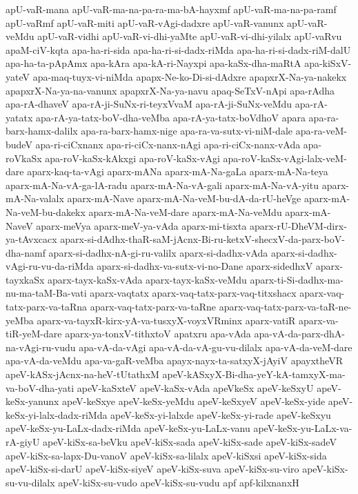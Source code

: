 {apU-vaR-mana
apU-vaR-ma-na-pa-ra-ma-bA-hayxmf
apU-vaR-ma-na-pa-ramf
apU-vaRmf
apU-vaR-miti
apU-vaR-vAgi-dadxre
apU-vaR-vanunx
apU-vaR-veMdu
apU-vaR-vidhi
apU-vaR-vi-dhi-yaMte
apU-vaR-vi-dhi-yilalx
apU-vaRvu
apaM-ciV-kqta
apa-ha-ri-sida
apa-ha-ri-si-dadx-riMda
apa-ha-ri-si-dadx-riM-dalU
apa-ha-ta-pApAmx
apa-kAra
apa-kA-ri-Nayxpi
apa-kaSx-dha-maRtA
apa-kiSxV-yateV
apa-maq-tuyx-vi-niMda
apapx-Ne-ko-Di-si-dAdxre
apapxrX-Na-ya-nakekx
apapxrX-Na-ya-na-vanunx
apapxrX-Na-ya-navu
apaq-SeTxV-nApi
apa-rAdha
apa-rA-dhaveV
apa-rA-ji-SuNx-ri-teyxVvaM
apa-rA-ji-SuNx-veMdu
apa-rA-yatatx
apa-rA-ya-tatx-boV-dha-veMba
apa-rA-ya-tatx-boVdhoV
apara
apa-ra-barx-hamx-dalilx
apa-ra-barx-hamx-nige
apa-ra-va-sutx-vi-niM-dale
apa-ra-veM-budeV
apa-ri-ciCxnanx
apa-ri-ciCx-nanx-nAgi
apa-ri-ciCx-nanx-vAda
apa-roVkaSx
apa-roV-kaSx-kAkxgi
apa-roV-kaSx-vAgi
apa-roV-kaSx-vAgi-lalx-veM-dare
aparx-kaq-ta-vAgi
aparx-mANa
aparx-mA-Na-gaLa
aparx-mA-Na-teya
aparx-mA-Na-vA-ga-lA-radu
aparx-mA-Na-vA-gali
aparx-mA-Na-vA-yitu
aparx-mA-Na-valalx
aparx-mA-Nave
aparx-mA-Na-veM-bu-dA-da-rU-heVge
aparx-mA-Na-veM-bu-dakekx
aparx-mA-Na-veM-dare
aparx-mA-Na-veMdu
aparx-mA-NaveV
aparx-meVya
aparx-meV-ya-vAda
aparx-mi-tisxta
aparx-rU-DheVM-dirx-ya-tAvxcacx
aparx-si-dAdhx-thaR-saM-jAcnx-Bi-ru-ketxV-shecxV-da-parx-boV-dha-namf
aparx-si-dadhx-nA-gi-ru-valilx
aparx-si-dadhx-vAda
aparx-si-dadhx-vAgi-ru-vu-da-riMda
aparx-si-dadhx-va-sutx-vi-no-Dane
aparx-sidedhxV
aparx-tayxkaSx
aparx-tayx-kaSx-vAda
aparx-tayx-kaSx-veMdu
aparx-ti-Si-dadhx-ma-nu-ma-taM-Ba-vati
aparx-vaqtatx
aparx-vaq-tatx-parx-vaq-titxshacx
aparx-vaq-tatx-parx-va-taRna
aparx-vaq-tatx-parx-va-taRne
aparx-vaq-tatx-parx-va-taR-ne-yeMba
aparx-va-tayxR-kirx-yA-va-tusxyX-voyxVRminx
aparx-vatiR
aparx-va-tiR-yeM-dare
aparx-ya-tonxV-tithxtoV
apatxru
apa-vAda
apa-vA-da-parx-dhA-na-vAgi-ru-vudu
apa-vA-da-vAgi
apa-vA-da-vA-gu-vu-dilalx
apa-vA-da-veM-dare
apa-vA-da-veMdu
apa-va-gaR-veMba
apayx-nayx-ta-satxyX-jAyiV
apayxtheVR
apeV-kASx-jAcnx-na-heV-tUtathxM
apeV-kASxyX-Bi-dha-yeY-kA-tamxyX-ma-va-boV-dha-yati
apeV-kaSxteV
apeV-kaSx-vAda
apeVkeSx
apeV-keSxyU
apeV-keSx-yanunx
apeV-keSxye
apeV-keSx-yeMdu
apeV-keSxyeV
apeV-keSx-yide
apeV-keSx-yi-lalx-dadx-riMda
apeV-keSx-yi-lalxde
apeV-keSx-yi-rade
apeV-keSxyu
apeV-keSx-yu-LaLx-dadx-riMda
apeV-keSx-yu-LaLx-vanu
apeV-keSx-yu-LaLx-va-rA-giyU
apeV-kiSx-sa-beVku
apeV-kiSx-sada
apeV-kiSx-sade
apeV-kiSx-sadeV
apeV-kiSx-sa-lapx-Du-vanoV
apeV-kiSx-sa-lilalx
apeV-kiSxsi
apeV-kiSx-sida
apeV-kiSx-si-darU
apeV-kiSx-siyeV
apeV-kiSx-suva
apeV-kiSx-su-viro
apeV-kiSx-su-vu-dilalx
apeV-kiSx-su-vudo
apeV-kiSx-su-vudu
apf
apf-kilxnanxH
}
